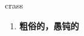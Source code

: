 
\begin{frame}
{\huge crass}
\begin{center}
\begin{enumerate}\Large
  \item \textbf{粗俗的，愚钝的}
\end{enumerate}
\end{center}
\end{frame}
